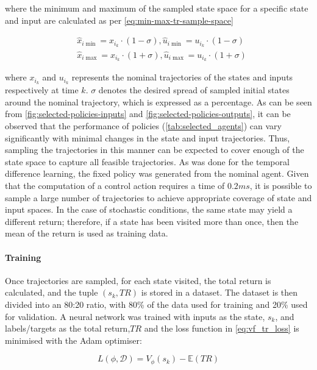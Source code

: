 where the minimum and maximum of the sampled state space for a specific state and input are calculated as per \autoref{eq:min-max-tr-sample-space}

\begin{equation}\label{eq:min-max-tr-sample-space}
\begin{aligned}
    &\hat{x}_{i\min} = x_{i_k} \cdot (1-\sigma),\hat{u}_{i\min} = u_{i_k} \cdot (1-\sigma)\\
    &\hat{x}_{i\max} = x_{i_k} \cdot (1+\sigma),\hat{u}_{i\max} = u_{i_k} \cdot (1+\sigma)
\end{aligned}
\end{equation}

where ${x}_{i_k}$ and ${u}_{i_k}$ represents the nominal trajectories of the states and inputs respectively at time $k$. $\sigma$ denotes the desired spread of sampled initial states around the nominal trajectory, which is expressed as a percentage. As can be seen from \autoref{fig:selected-policies-inputs} and \autoref{fig:selected-policies-outputs}, it can be observed that the performance of policies (\autoref{tab:selected_agents}) can vary significantly with minimal changes in the state and input trajectories. Thus, sampling the trajectories in this manner can be expected to cover enough of the state space to capture all feasible trajectories. As was done for the temporal difference learning, the fixed policy was generated from the nominal agent. Given that the computation of a control action requires a time of $0.2 ms$, it is possible to sample a large number of trajectories to achieve appropriate coverage of state and input spaces. In the case of stochastic conditions, the same state may yield a different return; therefore, if a state has been visited more than once, then the mean of the return is used as training data.

\paragraph{Training}
Once trajectories are sampled, for each state visited, the total return is calculated, and the tuple $(s_k,TR)$ is stored in a dataset. The dataset is then divided into an 80:20 ratio, with 80\% of the data used for training and 20\% used for validation. A neural network was trained with inputs as the state, $s_k$, and labels/targets as the total return,$TR$ and the loss function in \autoref{eq:vf_tr_loss} is minimised with the Adam optimiser:

\begin{equation}\label{eq:vf_tr_loss}
    L(\phi, \mathcal{D}) =   V_{\phi}(s_k) - \mathbb{E}(TR)
\end{equation}

